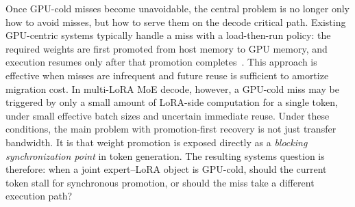 \documentclass[sigplan,anonymous,review,nonacm]{acmart}
\begin{document}
Once GPU-cold misses become unavoidable, the central problem is no longer only how to avoid misses, but how to serve them on the decode critical path. Existing GPU-centric systems typically handle a miss with a load-then-run policy: the required weights are first promoted from host memory to GPU memory, and execution resumes only after that promotion completes~\cite{todo:gpu-offload}. This approach is effective when misses are infrequent and future reuse is sufficient to amortize migration cost. In multi-LoRA MoE decode, however, a GPU-cold miss may be triggered by only a small amount of LoRA-side computation for a single token, under small effective batch sizes and uncertain immediate reuse. Under these conditions, the main problem with promotion-first recovery is not just transfer bandwidth. It is that weight promotion is exposed directly as a \emph{blocking synchronization point} in token generation. The resulting systems question is therefore: when a joint expert--LoRA object is GPU-cold, should the current token stall for synchronous promotion, or should the miss take a different execution path?

\end{document}
